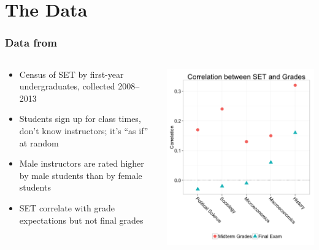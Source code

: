 \documentclass{beamer}
\begin{document}
\section{The Data}
\frame
{
  \frametitle{Data from \cite{Boring2015}}
\begin{columns}[T]
\begin{column}{.5\textwidth}
\begin{center}
\begin{itemize}
\item Census of SET by first-year undergraduates, collected 2008--2013
\item Students sign up for class times, don't know instructors; it's ``as if'' at random
\item Male instructors are rated higher by male students than by female students
\item SET correlate with grade expectations but not final grades
\end{itemize}
\end{center}
\end{column}
\begin{column}{.5\textwidth}
\begin{center}
\includegraphics[width=\textwidth]{fig/dotplot.png}
\end{center}
\end{column}
\end{columns}

}
\end{document}
